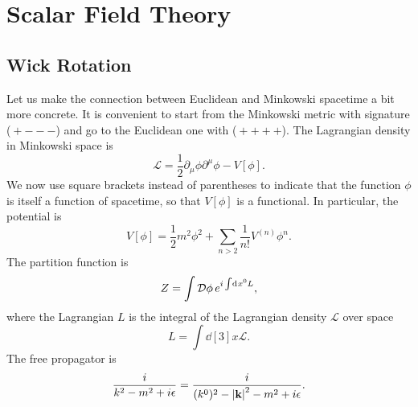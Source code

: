 
\chapter{Scalar Field Theory}%
\label{cha:scalar_field_theory}

\section{Wick Rotation}%
\label{sec:wick_rotation}

Let us make the connection between Euclidean and Minkowski spacetime a bit more concrete.
It is convenient to start from the Minkowski metric with signature (${}+ - - -{}$) and go to the Euclidean one with (${}+ + + +{}$).
The Lagrangian density in Minkowski space is
\begin{equation}
  \label{eq:8-minkl}
  \mathscr{L} = \frac{1}{2} \partial_{\mu} \phi \partial^{\mu} \phi - V[\phi].
\end{equation}
We now use square brackets instead of parentheses to indicate that the function $\phi$ is itself a function of spacetime, so that $V[\phi]$ is a functional.
In particular, the potential is
\begin{equation}
  V[\phi] = \frac{1}{2} m^2 \phi^2 + \sum_{n > 2} \frac{1}{n!} V^{(n)} \phi^n.
\end{equation}
The partition function is
\begin{equation}
  Z = \int \mathop{\mathcal{D} \phi} e^{i \int \dd[]{x}^0 L}, 
\end{equation}
where the Lagrangian $L$  is the integral of the Lagrangian density $\mathscr{L}$  over space
\begin{equation}
  L = \int \dd[3]{x} \mathscr{L}.
\end{equation}
The free propagator is
\begin{equation}
  \frac{i}{k^2 - m^2 + i \epsilon} = \frac{i}{(k^0)^2 - \abs{\vb{k}}^2 - m^2 + i \epsilon}.
\end{equation}

